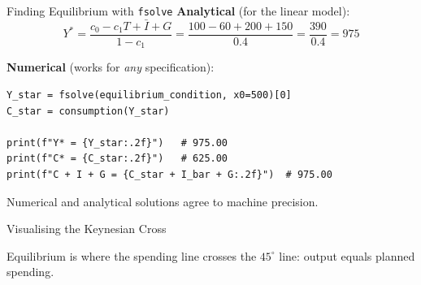 \documentclass[aspectratio=169, 10pt]{beamer}
\begin{document}
\begin{frame}[fragile]{Finding Equilibrium with \texttt{fsolve}}
\textbf{Analytical} (for the linear model):
\[
  Y^* = \frac{c_0 - c_1 T + \bar{I} + G}{1 - c_1}
     = \frac{100 - 60 + 200 + 150}{0.4} = \frac{390}{0.4} = 975
\]

\textbf{Numerical} (works for \textit{any} specification):
\begin{lstlisting}
Y_star = fsolve(equilibrium_condition, x0=500)[0]
C_star = consumption(Y_star)

print(f"Y* = {Y_star:.2f}")   # 975.00
print(f"C* = {C_star:.2f}")   # 625.00
print(f"C + I + G = {C_star + I_bar + G:.2f}")  # 975.00
\end{lstlisting}
\vspace{0.3em}
Numerical and analytical solutions agree to machine precision.
\end{frame}

\begin{frame}{Visualising the Keynesian Cross}
\begin{center}
\end{center}
\vspace{0.3em}
Equilibrium is where the spending line crosses the $45^{\circ}$ line:
output equals planned spending.
\end{frame}
\end{document}
